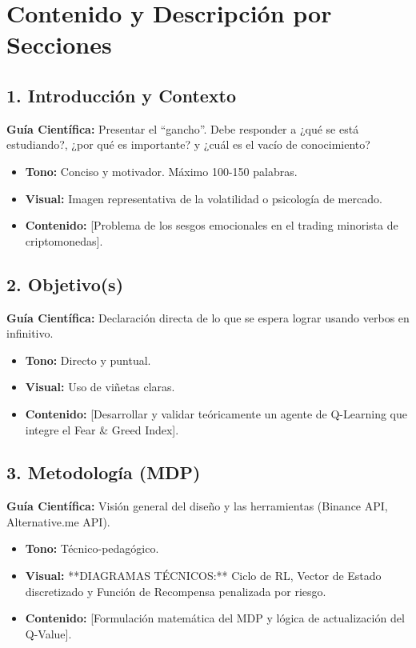 \documentclass[12pt, a4paper]{article}
\begin{document}
\section{Contenido y Descripción por Secciones}

\subsection{1. Introducción y Contexto}
\textbf{Guía Científica:} Presentar el ``gancho''. Debe responder a ¿qué se está estudiando?, ¿por qué es importante? y ¿cuál es el vacío de conocimiento?
\begin{itemize}
    \item \textbf{Tono:} Conciso y motivador. Máximo 100-150 palabras.
    \item \textbf{Visual:} Imagen representativa de la volatilidad o psicología de mercado.
    \item \textbf{Contenido:} [Problema de los sesgos emocionales en el trading minorista de criptomonedas].
\end{itemize}

\subsection{2. Objetivo(s)}
\textbf{Guía Científica:} Declaración directa de lo que se espera lograr usando verbos en infinitivo.
\begin{itemize}
    \item \textbf{Tono:} Directo y puntual.
    \item \textbf{Visual:} Uso de viñetas claras.
    \item \textbf{Contenido:} [Desarrollar y validar teóricamente un agente de Q-Learning que integre el Fear \& Greed Index].
\end{itemize}

\subsection{3. Metodología (MDP)}
\textbf{Guía Científica:} Visión general del diseño y las herramientas (Binance API, Alternative.me API).
\begin{itemize}
    \item \textbf{Tono:} Técnico-pedagógico.
    \item \textbf{Visual:} **DIAGRAMAS TÉCNICOS:** Ciclo de RL, Vector de Estado discretizado y Función de Recompensa penalizada por riesgo.
    \item \textbf{Contenido:} [Formulación matemática del MDP y lógica de actualización del Q-Value].
\end{itemize}
\end{document}
